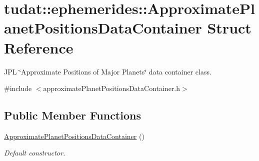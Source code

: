 \hypertarget{structtudat_1_1ephemerides_1_1ApproximatePlanetPositionsDataContainer}{}\section{tudat\+:\+:ephemerides\+:\+:Approximate\+Planet\+Positions\+Data\+Container Struct Reference}
\label{structtudat_1_1ephemerides_1_1ApproximatePlanetPositionsDataContainer}


J\+PL \char`\"{}\+Approximate Positions of Major Planets\char`\"{} data container class.  




{\ttfamily \#include $<$approximate\+Planet\+Positions\+Data\+Container.\+h$>$}

\subsection*{Public Member Functions}
\begin{DoxyCompactItemize}
\item 
\hyperlink{structtudat_1_1ephemerides_1_1ApproximatePlanetPositionsDataContainer_a687ec166207da1954e50eccbc7bf4583}{Approximate\+Planet\+Positions\+Data\+Container} ()
\begin{DoxyCompactList}\small\item\em Default constructor. \end{DoxyCompactList}\end{DoxyCompactItemize}
